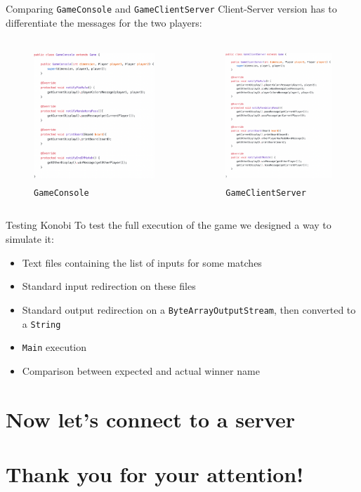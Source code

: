 \documentclass{beamer}
\begin{document}
\begin{frame}{Comparing \texttt{GameConsole} and \texttt{GameClientServer}}
Client-Server version has to differentiate the messages for the two players:
\begin{columns}
			\begin{figure}
				\includegraphics[height=5cm, keepaspectratio]{images/gameconsole.png}
				\caption*{\texttt{GameConsole}}
			\end{figure}
					
			\begin{figure}
				\includegraphics[height=5cm, keepaspectratio]{images/gamecs.png}
				\caption*{\texttt{GameClientServer}}
			\end{figure}
		
	\end{columns}
\end{frame}

\begin{frame}{Testing Konobi}
To test the full execution of the game we designed a way to simulate it:
\begin{itemize}

\item Text files containing the list of inputs for some matches
\item Standard input redirection on these files
\item Standard output redirection on a \texttt{ByteArrayOutputStream}, then converted to a \texttt{String}
\item \texttt{Main} execution
\item Comparison between expected and actual winner name
\end{itemize}
\end{frame}

\section{Now let's connect to a server}

\section{Thank you for your attention!}


     
\end{document}
